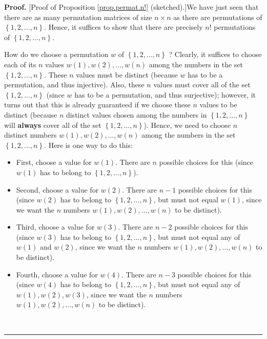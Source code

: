 \documentclass[numbers=enddot,12pt,final,onecolumn,notitlepage]{scrartcl}%
\theoremstyle{definition}
\newenvironment{proof}[1][Proof]{\noindent\textbf{#1.} }{\ \rule{0.5em}{0.5em}}
\begin{document}
\begin{proof}
[Proof of Proposition \ref{prop.permat.n!} (sketched).]We have just seen that
there are as many permutation matrices of size $n\times n$ as there are
permutations of $\left\{  1,2,\ldots,n\right\}  $. Hence, it suffices to show
that there are precisely $n!$ permutations of $\left\{  1,2,\ldots,n\right\}
$.

How do we choose a permutation $w$ of $\left\{  1,2,\ldots,n\right\}  $ ?
Clearly, it suffices to choose each of its $n$ values $w\left(  1\right)
,w\left(  2\right)  ,\ldots,w\left(  n\right)  $ among the numbers in the set
$\left\{  1,2,\ldots,n\right\}  $. These $n$ values must be distinct (because
$w$ has to be a permutation, and thus injective). Also, these $n$ values must
cover all of the set $\left\{  1,2,\ldots,n\right\}  $ (since $w$ has to be a
permutation, and thus surjective); however, it turns out that this is already
guaranteed if we choose these $n$ values to be distinct (because $n$ distinct
values chosen among the numbers in $\left\{  1,2,\ldots,n\right\}  $ will
\textbf{always} cover all of the set $\left\{  1,2,\ldots,n\right\}  $).
Hence, we need to choose $n$ distinct numbers $w\left(  1\right)  ,w\left(
2\right)  ,\ldots,w\left(  n\right)  $ among the numbers in the set $\left\{
1,2,\ldots,n\right\}  $. Here is one way to do this:

\begin{itemize}
\item First, choose a value for $w\left(  1\right)  $. There are $n$ possible
choices for this (since $w\left(  1\right)  $ has to belong to $\left\{
1,2,\ldots,n\right\}  $).

\item Second, choose a value for $w\left(  2\right)  $. There are $n-1$
possible choices for this (since $w\left(  2\right)  $ has to belong to
$\left\{  1,2,\ldots,n\right\}  $, but must not equal $w\left(  1\right)  $,
since we want the $n$ numbers $w\left(  1\right)  ,w\left(  2\right)
,\ldots,w\left(  n\right)  $ to be distinct).

\item Third, choose a value for $w\left(  3\right)  $. There are $n-2$
possible choices for this (since $w\left(  3\right)  $ has to belong to
$\left\{  1,2,\ldots,n\right\}  $, but must not equal any of $w\left(
1\right)  $ and $w\left(  2\right)  $, since we want the $n$ numbers $w\left(
1\right)  ,w\left(  2\right)  ,\ldots,w\left(  n\right)  $ to be distinct).

\item Fourth, choose a value for $w\left(  4\right)  $. There are $n-3$
possible choices for this (since $w\left(  4\right)  $ has to belong to
$\left\{  1,2,\ldots,n\right\}  $, but must not equal any of $w\left(
1\right)  ,w\left(  2\right)  ,w\left(  3\right)  $, since we want the $n$
numbers $w\left(  1\right)  ,w\left(  2\right)  ,\ldots,w\left(  n\right)  $
to be distinct).


\end{itemize}
\end{proof}
\end{document}
